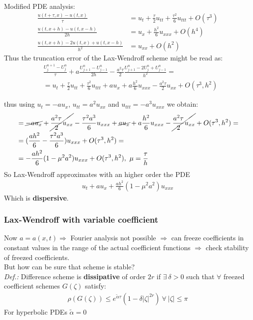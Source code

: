 \documentclass{beamer}
\begin{document}
\begin{frame}
Modified PDE analysis:
\begin{align*}
\frac{u(t+\tau,x) - u(t,x)}{\tau} & = u_t + \frac{\tau}{2}u_{tt} + \frac{\tau^2}{6}u_{ttt} + O(\tau^3) \\
\frac{u(t,x + h) - u(t,x-h)}{2h} & = u_x + \frac{h^2}{6}u_{xxx} + O(h^4) \\
\frac{u(t,x+h) - 2u(t,x) + u(t,x-h)}{h^2} & = u_{xx} + O(h^2)
\end{align*}
Thus the truncation error of the Lax-Wendroff scheme might be read as:
\begin{align*}
& \frac{U_j^{n+1} - U_j^n}{\tau} + a \frac{U_{j+1}^n -U_{j-1}^n}{2h} -\frac{a^2\tau}{2}\frac{U_{j+1}^n -2U_j^n+U_{j-1}^n}{h^2} = \\
& = u_t + \frac{\tau}{2}u_{tt} + \frac{\tau^2}{6}u_{ttt} + au_x + a\frac{h^2}{6}u_{xxx} - \frac{a^2\tau}{2} u_{xx} + O(\tau^3,h^2)
\end{align*}
\end{frame}
\begin{frame}
thus using $u_t = -au_x$, $u_{tt} = a^2u_{xx}$ and $u_{ttt} = -a^3u_{xxx}$ we obtain:
\begin{align*}
& = \cancel{-au_x} + \cancel{\frac{a^2\tau}{2}u_{xx}} -\frac{\tau^2a^3}{6}u_{xxx} + \cancel{au_x} + a\frac{h^2}{6}u_{xxx} - \cancel{\frac{a^2\tau}{2} u_{xx}} + O(\tau^3,h^2) = \\
& = (\frac{ah^2}{6} - \frac{\tau^2a^3}{6})u_{xxx} + O(\tau^3,h^2) = \\
& = -\frac{ah^2}{6}(1-\mu^2a^2)u_{xxx} + O(\tau^3,h^2), \ \mu = \frac{\tau}{h}
\end{align*}
So Lax-Wendroff approximates with an higher order the PDE
\begin{align*}
u_t + au_x +\frac{ah^2}{6}(1-\mu^2a^2)u_{xxx}
\end{align*}
Which is \textbf{dispersive}.
\end{frame}
\begin{frame}
\frametitle{Lax-Wendroff with variable coefficient}
Now $a = a(x,t) \Rightarrow$ Fourier analysis not possible $\Rightarrow$ can freeze coefficients in constant values in the range of
the actual coefficient functions $\Rightarrow$ check stability of freezed coefficients. \\
But how can be sure that scheme is stable? \\
\textit{Def.:} Difference scheme is \textbf{dissipative} of order $2r$ if $\exists \ \delta > 0$ such that $\forall$ freezed coefficient schemes $G(\zeta)$ satisfy:
\begin{align*}
\rho(G(\zeta)) \leq e^{\tilde{\alpha}\tau}(1-\delta|\zeta|^{2r}) \ \forall \ |\zeta| \leq \pi
\end{align*}
For hyperbolic PDEs $\tilde{\alpha} = 0$
\end{frame}
\end{document}
